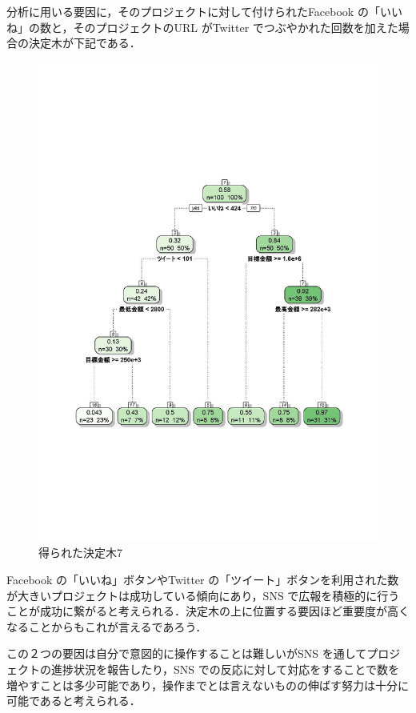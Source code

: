 分析に用いる要因に，そのプロジェクトに対して付けられたFacebook の「いいね」の数と，そのプロジェクトのURL がTwitter でつぶやかれた回数を加えた場合の決定木が下記である．

\begin{figure}[H]
\centering
\includegraphics[width=13cm]{figure23.pdf}
\caption{得られた決定木7}\label{sannp}
\end{figure}

Facebook の「いいね」ボタンやTwitter の「ツイート」ボタンを利用された数が大きいプロジェクトは成功している傾向にあり，SNS で広報を積極的に行うことが成功に繋がると考えられる．決定木の上に位置する要因ほど重要度が高くなることからもこれが言えるであろう．

この２つの要因は自分で意図的に操作することは難しいがSNS を通してプロジェクトの進捗状況を報告したり，SNS での反応に対して対応をすることで数を増やすことは多少可能であり，操作までとは言えないものの伸ばす努力は十分に可能であると考えられる．


